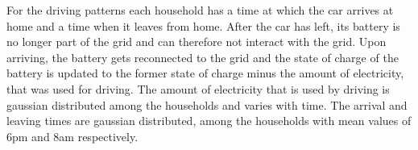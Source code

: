 \documentclass[a4paper]{article}
\begin{document}
For the driving patterns each household has a time at which the car arrives at home and a time when it leaves from home. After the 
car has left, its battery is no longer part of the grid and can therefore not interact with the grid. Upon arriving, the battery gets 
reconnected to the grid and the state of charge of the battery is updated to the former state of charge minus the amount of electricity,
that was used for driving. The amount of electricity that is used by driving is gaussian distributed among the households and 
varies with time.
The arrival and leaving times are gaussian distributed, among the households with mean values of 6pm and 8am respectively.
\\

\end{document}
